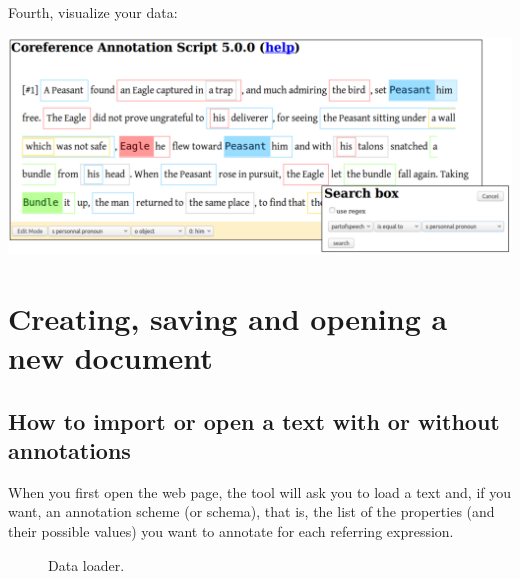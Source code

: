 \documentclass[12pt]{article}
\begin{document}
Fourth, visualize your data:\nopagebreak

\includegraphics[width=15cm]{imgs/workflow4.png}


 \section{Creating, saving and opening a new document}

 \subsection{How to import or open a text with or without annotations}

When you first open the web page, the tool will ask you to load a text and,
if you want, an annotation scheme (or schema), that is, the list of the
properties (and their possible values) you want to annotate for each
referring expression.

\begin{figure}
\begin{center}
\end{center}
\caption{Data loader.}
\label{fig:data-loader}
\end{figure}
\end{document}
